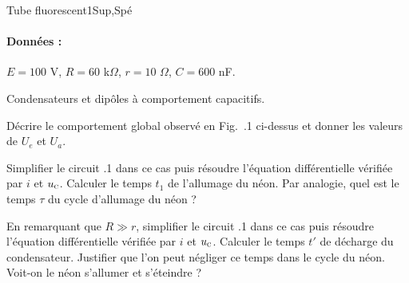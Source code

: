 \begin{exercise}{Tube fluorescent}{1}{Sup,Spé}
\paragraph{Données :} $E = 100$ V, $R = 60$ k$\Omega$, $r = 10$ $\Omega$, $C = 600$ nF.


\begin{questions}
    \questioncours Condensateurs et dipôles à comportement capacitifs.
    
    \question Décrire le comportement global observé en Fig.~.1 ci-dessus et donner les valeurs de $U_e$ et $U_a$.
    
    
    \question Simplifier le circuit .1 dans ce cas puis résoudre l'équation différentielle vérifiée par $i$ et $u_\textsc{c}$.
    \question Calculer le temps $t_1$ de l'allumage du néon. Par analogie, quel est le temps $\tau$ du cycle d'allumage du néon ?
    
     
    \question En remarquant que $R\gg r$, simplifier le circuit .1 dans ce cas puis résoudre l'équation différentielle vérifiée par $i$ et $u_\textsc{c}$.
    \question Calculer le temps $t'$ de décharge du condensateur. Justifier que l'on peut négliger ce temps dans le cycle du néon. Voit-on le néon s'allumer et s'éteindre ?
    
\end{questions}
\end{exercise}